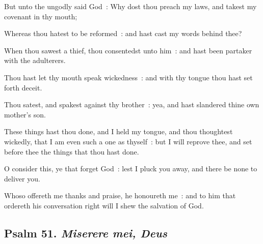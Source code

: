 But unto the ungodly said God~: Why dost thou preach my laws, and takest my covenant in thy mouth;\par
{}Whereas thou hatest to be reformed~: and hast cast my words behind thee?\par
{}When thou sawest a thief, thou consentedst unto him~: and hast been partaker with the adulterers.\par
{}Thou hast let thy mouth speak wickedness~: and with thy tongue thou hast set forth deceit.\par
{}Thou satest, and spakest against thy brother~: yea, and hast slandered thine own mother's son.\par
\clearpage
{}These things hast thou done, and I held my tongue, and thou thoughtest wickedly, that I am even such a one as thyself~: but I will reprove thee, and set before thee the things that thou hast done.\par
{}O consider this, ye that forget God~: lest I pluck you away, and there be none to deliver you.\par
{}Whoso offereth me thanks and praise, he honoureth me~: and to him that ordereth his conversation right will I shew the salvation of God.\par

\subsection{Psalm 51. \textit{Miserere mei, Deus}}

